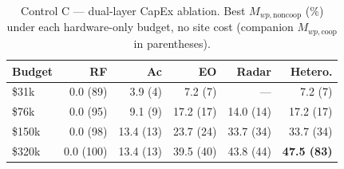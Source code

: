 \begin{table}[t]
\centering
\caption{Control C --- dual-layer CapEx ablation. Best $M_{wp,\mathrm{noncoop}}$ (\%) under each hardware-only budget, no site cost (companion $M_{wp,\mathrm{coop}}$ in parentheses).}
\label{tab:modality_ablation_dual_noncoop}
\setlength{\tabcolsep}{3pt}
\begin{tabular}{lrrrrr}
\toprule
Budget & RF & Ac & EO & Radar & Hetero. \\
\midrule
\$31k & 0.0 (89) & 3.9 (4) & 7.2 (7) & --- & 7.2 (7) \\
\$76k & 0.0 (95) & 9.1 (9) & 17.2 (17) & 14.0 (14) & 17.2 (17) \\
\$150k & 0.0 (98) & 13.4 (13) & 23.7 (24) & 33.7 (34) & 33.7 (34) \\
\$320k & 0.0 (100) & 13.4 (13) & 39.5 (40) & 43.8 (44) & \textbf{47.5 (83)} \\
\bottomrule
\end{tabular}
\end{table}
